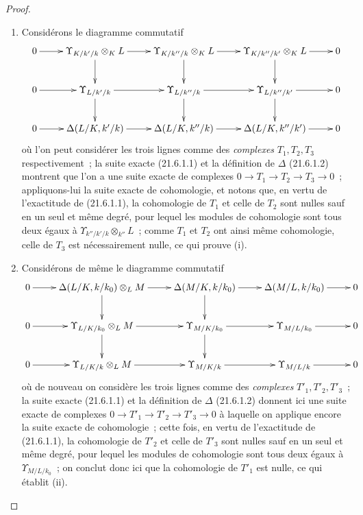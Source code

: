 \begin{proof}
\begin{enumerate}
  \item[(i)] Considérons le diagramme commutatif
\[
\xymatrix{
0\ar[r]&\Upsilon_{K/k'/k}\otimes_KL\ar[r]\ar[d]&
\Upsilon_{K/k''/k}\otimes_KL\ar[r]\ar[d]&
\Upsilon_{K/k''/k'}\otimes_KL\ar[r]\ar[d]&0\\
0\ar[r]&\Upsilon_{L/k'/k}\ar[r]\ar[d]&
\Upsilon_{L/k''/k}\ar[r]\ar[d]&
\Upsilon_{L/k''/k'}\ar[r]\ar[d]&0\\
0\ar[r]&\Delta(L/K,k'/k)\ar[r]&\Delta(L/K,k''/k)\ar[r]&
\Delta(L/K,k''/k')\ar[r]&0
}
\]
où l'on peut considérer les trois lignes comme des \emph{complexes}
$T_1,T_2,T_3$ respectivement~; la suite exacte (21.6.1.1) et la définition
de $\Delta$ (21.6.1.2) montrent que l'on a une suite exacte de complexes
$0\to T_1\to T_2\to T_3\to0$~; appliquons-lui la suite exacte de
cohomologie, et notons que, en vertu de l'exactitude de (21.6.1.1), la
cohomologie de $T_1$ et celle de $T_2$ sont nulles sauf en un seul et même
degré, pour lequel les modules de cohomologie sont tous deux égaux à
$\Upsilon_{k''/k'/k}\otimes_{k''}L$~; comme $T_1$ et $T_2$ ont ainsi même
cohomologie, celle de $T_3$ est nécessairement nulle, ce qui prouve (i).
  \item[(ii)] Considérons de même le diagramme commutatif
\[
\xymatrix{
0\ar[r]&\Delta(L/K,k/k_0)\otimes_LM\ar[r]\ar[d]&
\Delta(M/K,k/k_0)\ar[r]\ar[d]&\Delta(M/L,k/k_0)\ar[r]&0\\
0\ar[r]&\Upsilon_{L/K/k_0}\otimes_LM\ar[r]\ar[d]&
\Upsilon_{M/K/k_0}\ar[r]\ar[d]&\Upsilon_{M/L/k_0}\ar[r]&0\\
0\ar[r]&\Upsilon_{L/K/k}\otimes_LM\ar[r]&
\Upsilon_{M/K/k}\ar[r]&\Upsilon_{M/L/k}\ar[r]&0
}
\]
où de nouveau on considère les trois lignes comme des \emph{complexes}
$T'_1,T'_2,T'_3$~; la suite exacte (21.6.1.1) et la définition de $\Delta$
(21.6.1.2) donnent ici une suite exacte de complexes
$0\to T'_1\to T'_2\to T'_3\to0$ à laquelle on applique encore la suite exacte
de cohomologie~; cette fois, en vertu de l'exactitude de (21.6.1.1), la
cohomologie de $T'_2$ et celle de $T'_3$ sont nulles sauf en un seul et même
degré, pour lequel les modules de cohomologie sont tous deux égaux à
$\Upsilon_{M/L/k_0}$~; on conclut donc ici que la cohomologie de $T'_1$ est
nulle, ce qui établit (ii).
\end{enumerate}
\end{proof}

